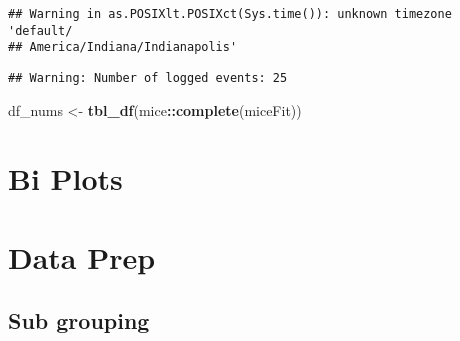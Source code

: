 \documentclass[]{article}
\newenvironment{Shaded}{\begin{snugshade}}{\end{snugshade}}
\newcommand{\KeywordTok}[1]{\textcolor[rgb]{0.13,0.29,0.53}{\textbf{#1}}}
\newcommand{\StringTok}[1]{\textcolor[rgb]{0.31,0.60,0.02}{#1}}
\newcommand{\CommentTok}[1]{\textcolor[rgb]{0.56,0.35,0.01}{\textit{#1}}}
\newcommand{\OperatorTok}[1]{\textcolor[rgb]{0.81,0.36,0.00}{\textbf{#1}}}
\newcommand{\NormalTok}[1]{#1}
\begin{document}
\begin{verbatim}
## Warning in as.POSIXlt.POSIXct(Sys.time()): unknown timezone 'default/
## America/Indiana/Indianapolis'
\end{verbatim}

\begin{verbatim}
## Warning: Number of logged events: 25
\end{verbatim}

\begin{Shaded}
\begin{Highlighting}[]
\NormalTok{df_nums <-}\StringTok{ }\KeywordTok{tbl_df}\NormalTok{(mice}\OperatorTok{::}\KeywordTok{complete}\NormalTok{(miceFit))}
\end{Highlighting}
\end{Shaded}

\section{Bi Plots}\label{bi-plots}

\begin{Shaded}
\end{Shaded}

\section{Data Prep}\label{data-prep-1}

\subsection{Sub grouping}\label{sub-grouping}
\end{document}
